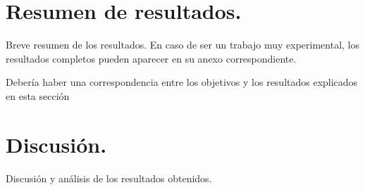 
\section{Resumen de resultados.}

Breve resumen de los resultados. En caso de ser un trabajo muy experimental, los resultados completos pueden aparecer en su anexo correspondiente.

Debería haber una correspondencia entre los objetivos y los resultados explicados en esta sección

\section{Discusión.}

Discusión y análisis de los resultados obtenidos.